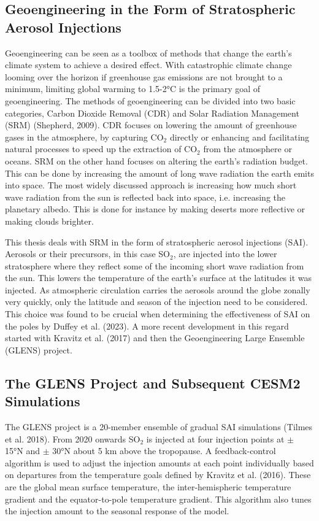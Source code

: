 \subsection{Geoengineering in the Form of Stratospheric Aerosol Injections}
Geoengineering can be seen as a toolbox of methods that change the earth's climate system to achieve a desired effect. With catastrophic climate change looming over the horizon if greenhouse gas emissions are not brought to a minimum, limiting global warming to 1.5-2°C is the primary goal of geoengineering. The methods of geoengineering can be divided into two basic categories, Carbon Dioxide Removal (CDR) and Solar Radiation Management (SRM) (Shepherd, 2009). CDR focuses on lowering the amount of greenhouse gases in the atmosphere, by capturing CO$_2$ directly or enhancing and facilitating natural processes to speed up the extraction of CO$_2$ from the atmosphere or oceans. SRM on the other hand focuses on altering the earth's radiation budget. This can be done by increasing the amount of long wave radiation the earth emits into space. The most widely discussed approach is increasing how much short wave radiation from the sun is reflected back into space, i.e. increasing the planetary albedo. This is done for instance by making deserts more reflective or making clouds brighter. 

This thesis deals with SRM in the form of stratospheric aerosol injections (SAI). Aerosols or their precursors, in this case SO$_2$, are injected into the lower stratosphere where they reflect some of the incoming short wave radiation from the sun. This lowers the temperature of the earth's surface at the latitudes it was injected. As atmospheric circulation carries the aerosols around the globe zonally very quickly, only the latitude and season of the injection need to be considered. This choice was found to be crucial when determining the effectiveness of SAI on the poles by Duffey et al. (2023). A more recent development in this regard started with Kravitz et al. (2017) and then the Geoengineering Large Ensemble (GLENS) project. 

\subsection{The GLENS Project and Subsequent CESM2 Simulations}
The GLENS project is a 20-member ensemble of gradual SAI simulations (Tilmes et al. 2018). From 2020 onwards SO$_2$ is injected at four injection points at $\pm$ 15°N and $\pm$ 30°N about 5 km above the tropopause. A feedback-control algorithm is used to adjust the injection amounts at each point individually based on departures from the temperature goals defined by Kravitz et al. (2016). These are the global mean surface temperature, the inter-hemispheric temperature gradient and the equator-to-pole temperature gradient. This algorithm also tunes the injection amount to the seasonal response of the model. 

